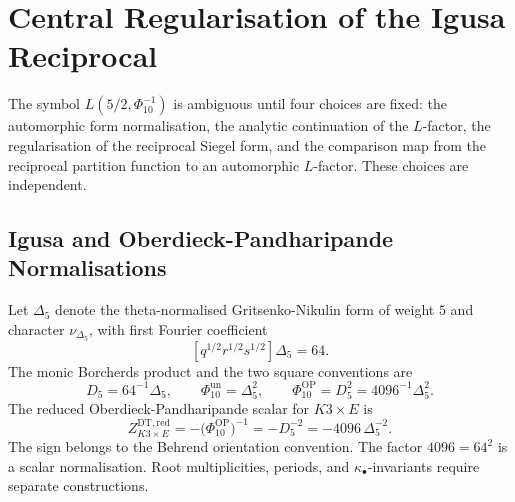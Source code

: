 
\providecommand{\kBKM}{\kappa_{\mathrm{BKM}}}
\providecommand{\kch}{\kappa_{\mathrm{ch}}}
\providecommand{\kcat}{\kappa_{\mathrm{cat}}}
\providecommand{\kfib}{\kappa_{\mathrm{fiber}}}
\providecommand{\kHeis}{\kappa_{\mathrm{ch}}^{\mathrm{Heis}}}
\providecommand{\Sp}{\mathrm{Sp}}
\providecommand{\SL}{\mathrm{SL}}
\providecommand{\DT}{\mathrm{DT}}
\providecommand{\GW}{\mathrm{GW}}
\providecommand{\MNOP}{\mathrm{MNOP}}
\providecommand{\BKM}{\mathrm{BKM}}
\providecommand{\CoHA}{\mathrm{CoHA}}
\providecommand{\red}{\mathrm{red}}
\providecommand{\spin}{\mathrm{spin}}
\providecommand{\un}{\mathrm{un}}
\providecommand{\OP}{\mathrm{OP}}
\providecommand{\reg}{\mathrm{reg}}
\providecommand{\cO}{\mathcal{O}}
\providecommand{\cF}{\mathcal{F}}
\providecommand{\cL}{\mathcal{L}}
\providecommand{\cR}{\mathcal{R}}
\providecommand{\cZ}{\mathcal{Z}}
\providecommand{\fg}{\mathfrak{g}}
\providecommand{\HH}{\mathbb{H}}
\providecommand{\CC}{\mathbb{C}}
\providecommand{\QQ}{\mathbb{Q}}
\providecommand{\ZZ}{\mathbb{Z}}

\section*{Central Regularisation of the Igusa Reciprocal}
\label{sec:central-regularisation-igusa-reciprocal}

The symbol \(L(5/2,\Phi_{10}^{-1})\) is ambiguous until four choices
are fixed: the automorphic form normalisation, the
analytic continuation of the \(L\)-factor, the regularisation of the
reciprocal Siegel form, and the comparison map from the reciprocal
partition function to an automorphic \(L\)-factor.  These choices are
independent.

\subsection*{Igusa and Oberdieck-Pandharipande Normalisations}

Let \(\Delta_5\) denote the theta-normalised Gritsenko-Nikulin form
of weight \(5\) and character \(\nu_{\Delta_5}\), with first Fourier
coefficient
\[
        [q^{1/2}r^{1/2}s^{1/2}]\Delta_5 = 64 .
\]
The monic Borcherds product and the two square conventions are
\[
        D_5=64^{-1}\Delta_5,\qquad
        \Phi_{10}^{\un}=\Delta_5^2,\qquad
        \Phi_{10}^{\OP}=D_5^2=4096^{-1}\Delta_5^2 .
\]
The reduced Oberdieck-Pandharipande scalar for \(K3\times E\) is
\[
        Z_{K3\times E}^{\DT,\red}
        =-\bigl(\Phi_{10}^{\OP}\bigr)^{-1}
        =-D_5^{-2}
        =-4096\,\Delta_5^{-2}.
\]
The sign belongs to the Behrend orientation convention.  The factor
\(4096=64^2\) is a scalar normalisation.  Root multiplicities,
periods, and \(\kappa_\bullet\)-invariants require separate
constructions.

